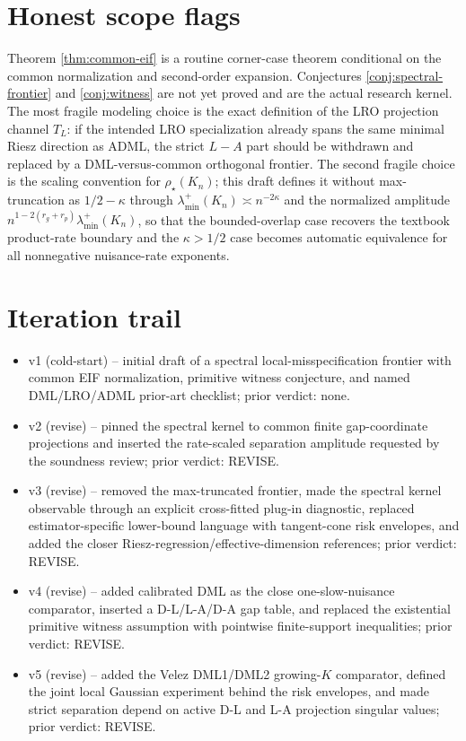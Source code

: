 \documentclass[11pt]{article}
\theoremstyle{definition}
\theoremstyle{plain}
\theoremstyle{remark}
\begin{document}
\section{Honest scope flags}
Theorem \ref{thm:common-eif} is a routine corner-case theorem conditional on
the common normalization and second-order expansion.  Conjectures
\ref{conj:spectral-frontier} and \ref{conj:witness} are not yet proved and are
the actual research kernel.  The most fragile modeling choice is the exact
definition of the LRO projection channel \(T_L\): if the intended LRO
specialization already spans the same minimal Riesz direction as ADML, the
strict \(L-A\) part should be withdrawn and replaced by a DML-versus-common
orthogonal frontier.  The second fragile choice is the scaling convention for
\(\rho_\star(K_n)\); this draft defines it without max-truncation as
\(1/2-\kappa\) through
\(\lambda_{\min}^+(K_n)\asymp n^{-2\kappa}\) and the normalized amplitude
\(n^{1-2(r_g+r_p)}\lambda_{\min}^+(K_n)\), so that the bounded-overlap case
recovers the textbook product-rate boundary and the \(\kappa>1/2\) case becomes
automatic equivalence for all nonnegative nuisance-rate exponents.

\section{Iteration trail}
\begin{itemize}[leftmargin=*]
\item v1 (cold-start) -- initial draft of a spectral local-misspecification
frontier with common EIF normalization, primitive witness conjecture, and
named DML/LRO/ADML prior-art checklist; prior verdict: none.
\item v2 (revise) -- pinned the spectral kernel to common finite
gap-coordinate projections and inserted the rate-scaled separation amplitude
requested by the soundness review; prior verdict: REVISE.
\item v3 (revise) -- removed the max-truncated frontier, made the spectral
kernel observable through an explicit cross-fitted plug-in diagnostic, replaced
estimator-specific lower-bound language with tangent-cone risk envelopes, and
added the closer Riesz-regression/effective-dimension references; prior
verdict: REVISE.
\item v4 (revise) -- added calibrated DML as the close one-slow-nuisance
comparator, inserted a D-L/L-A/D-A gap table, and replaced the existential
primitive witness assumption with pointwise finite-support inequalities; prior
verdict: REVISE.
\item v5 (revise) -- added the Velez DML1/DML2 growing-\(K\) comparator,
defined the joint local Gaussian experiment behind the risk envelopes, and made
strict separation depend on active D-L and L-A projection singular values; prior
verdict: REVISE.
\end{itemize}
\end{document}
